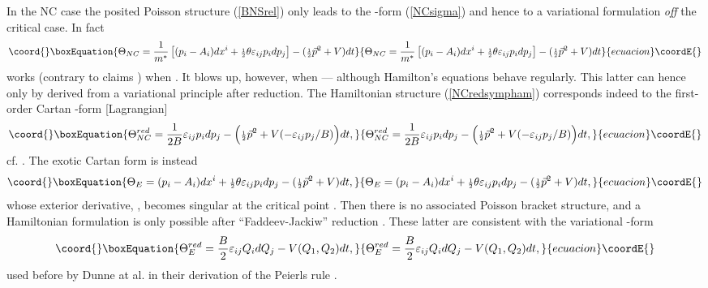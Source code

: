 \documentclass[a4paper,11pt]{article}
\providecommand{\half}{{\scriptstyle{\frac{1}{2}}}}
\def\vp{{\vec p}}
\begin{document}
In the NC case the posited Poisson structure (\ref{BNSrel})
only leads to the \coordHE{}-form (\ref{NCsigma}) and hence to a
variational formulation {\it off} the critical case. In fact
\begin{equation}\coord{}\boxEquation{
     \Theta_{NC}=\frac{1}{m^*}
     \left[(p_{i}-A_{i})dx^i+
     \half\theta\varepsilon_{ij}p_{i}dp_{j}\right]
     -(\half{\vp}^{2}+V)dt
\label{NCcartan}
}{
     \Theta_{NC}=\frac{1}{m^*}
     \left[(p_{i}-A_{i})dx^i+
     \half\theta\varepsilon_{ij}p_{i}dp_{j}\right]
     -(\half{\vp}^{2}+V)dt
}{ecuacion}\coordE{}\end{equation}
works (contrary to claims \cite{ACAT}) when \coordHE{}.
It blows up, however, when \coordHE{} --- although
   Hamilton's equations behave regularly. This latter can hence
   only by derived from a variational principle
after reduction. The Hamiltonian structure
(\ref{NCredsympham}) corresponds indeed to the first-order
Cartan \coordHE{}-form [Lagrangian]
\begin{equation}\coord{}\boxEquation{
     \Theta_{NC}^{red}=\frac{1}{2B}\varepsilon_{ij}p_{i} dp_{j}
     -\Big(\half\vp^2+V(-\varepsilon_{ij}p_{j}/B)\Big)dt,
     \label{NCredcartan}
}{
     \Theta_{NC}^{red}=\frac{1}{2B}\varepsilon_{ij}p_{i} dp_{j}
     -\Big(\half\vp^2+V(-\varepsilon_{ij}p_{j}/B)\Big)dt,
     }{ecuacion}\coordE{}\end{equation}
cf. \cite{ACAT}.
The exotic Cartan form is instead
\begin{equation}\coord{}\boxEquation{
     \Theta_{E}=(p_{i}-A_{i})dx^i+
     \half\theta\varepsilon_{ij}p_{i}dp_{j}
     -(\half{\vp}^{2}+V)dt,
\label{Ecartan}
}{
     \Theta_{E}=(p_{i}-A_{i})dx^i+
     \half\theta\varepsilon_{ij}p_{i}dp_{j}
     -(\half{\vp}^{2}+V)dt,
}{ecuacion}\coordE{}\end{equation}
whose exterior derivative, \coordHE{},
becomes singular at the critical point \coordHE{}.
  Then there is no associated Poisson bracket
structure, and a Hamiltonian formulation is only possible after
``Faddeev-Jackiw'' reduction \cite{FaJa, DH}. These latter
are consistent with the
variational \coordHE{}-form
\begin{equation}\coord{}\boxEquation{
     \Theta_{E}^{red}=\frac{B}{2}\varepsilon_{ij}Q_{i} dQ_{j}
     -V(Q_{1}, Q_{2})dt,
     \label{Eredcartan}
}{
     \Theta_{E}^{red}=\frac{B}{2}\varepsilon_{ij}Q_{i} dQ_{j}
     -V(Q_{1}, Q_{2})dt,
     }{ecuacion}\coordE{}\end{equation}
used before by Dunne at al. in their \coordHE{}
derivation of the Peierls rule \cite{DJT}.
\end{document}
